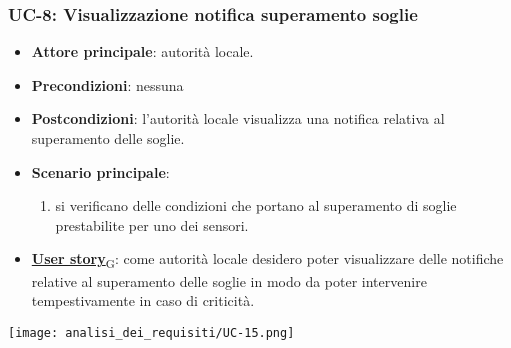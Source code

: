 \subsubsection{UC-8: Visualizzazione notifica superamento soglie}
\begin{itemize}
	\item \textbf{Attore principale}: autorità locale.
	\item \textbf{Precondizioni}: nessuna
	\item \textbf{Postcondizioni}: l'autorità locale visualizza una notifica relativa al superamento delle soglie.
	\item \textbf{Scenario principale}:
	      \begin{enumerate}
		      \item si verificano delle condizioni che portano al superamento di soglie prestabilite per uno dei sensori.
	      \end{enumerate}
	\item \href{https://7last.github.io/docs/rtb/documentazione-interna/glossario\#user-story}{\textbf{User story}\textsubscript{G}}:
	      come autorità locale desidero poter visualizzare delle notifiche relative al superamento delle soglie in modo da poter intervenire tempestivamente in caso di criticità.
\end{itemize}
\begin{center}
	\texttt{[image: analisi\_dei\_requisiti/UC-15.png]}
\end{center}

